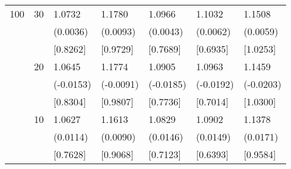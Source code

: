 \begin{table}[H]
{\begin{tabular}{c c | C{2.4cm} | C{2.4cm} | C{2.4cm} | C{2.4cm} | C{2.4cm} }
			100&30&1.0732&1.1780&1.0966&1.1032&1.1508\\
			&&(0.0036)&(0.0093)&(0.0043)&(0.0062)&(0.0059)\\
			&&[0.8262]&[0.9729]&[0.7689]&[0.6935]&[1.0253]\\
			&20&1.0645&1.1774&1.0905&1.0963&1.1459\\
			&&(-0.0153)&(-0.0091)&(-0.0185)&(-0.0192)&(-0.0203)\\
			&&[0.8304]&[0.9807]&[0.7736]&[0.7014]&[1.0300]\\
			&10&1.0627&1.1613&1.0829&1.0902&1.1378\\
			&&(0.0114)&(0.0090)&(0.0146)&(0.0149)&(0.0171)\\
			&&[0.7628]&[0.9068]&[0.7123]&[0.6393]&[0.9584]\\
			\bottomrule[1.5pt]
	\end{tabular}}
	\label{table:table S.3}
\end{table}


